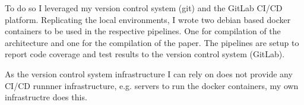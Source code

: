 To do so I leveraged my version control system (git) and the GitLab CI/CD platform. Replicating the local environments, I wrote two debian based docker containers \cite{dockerVerilator} \cite{dockerLatex} to be used in the respective pipelines. One for compilation of the architecture and one for the compilation of the paper. The pipelines are setup to report code coverage and test results to the version control system (GitLab). 

As the version control system infrastructure I can rely on does not provide any CI/CD runnner infrastructure, e.g. servers to run the docker containers, my own infrastructre does this.



